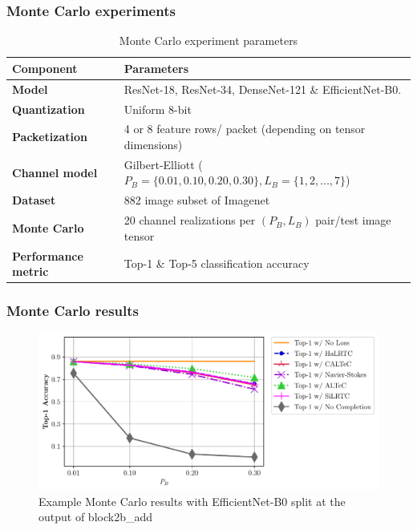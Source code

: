 \documentclass[aspectratio=169]{beamer}
\begin{document}
\begin{frame}
\frametitle{Monte Carlo experiments}
    \begin{table}[t]   \caption{Monte Carlo experiment parameters}
  \label{tab:description:mc}
  \centering
 \begin{tabular}{ l | l }
   \textbf{Component} & \textbf{Parameters} \\
      \hline
      \hline
      \textbf{Model} & ResNet-18, ResNet-34, DenseNet-121 \& EfficientNet-B0. \\
      \hline  
      \textbf{Quantization} & Uniform 8-bit \\
      \hline
      \textbf{Packetization} & 4 or 8 feature rows/ packet (depending on tensor dimensions) \\
      \hline
      \textbf{Channel model} & Gilbert-Elliott ($P_B = \{0.01,0.10,0.20,0.30\},L_B=\{1,2,\dotsc,7\}$)\\
      \hline
      \textbf{Dataset} & 882 image subset of Imagenet \\
      \hline
      \textbf{Monte Carlo} & 20 channel realizations per $(P_B,L_B)$ pair/test image tensor \\
      \hline
      \textbf{Performance metric} & Top-1 \& Top-5 classification accuracy
    \end{tabular}
\end{table}

\end{frame}


\begin{frame}
	\frametitle{Monte Carlo results}
	\begin{figure}[H]
	    \centering
	    \includegraphics[scale=0.6]{lp_accumulated_vcip_rpp_8_top1_legend.pdf}
	    \caption{Example Monte Carlo results with EfficientNet-B0 split at the output of block2b\_add}
	    \label{fig:mc}
	\end{figure}
	
\end{frame}
\end{document}
